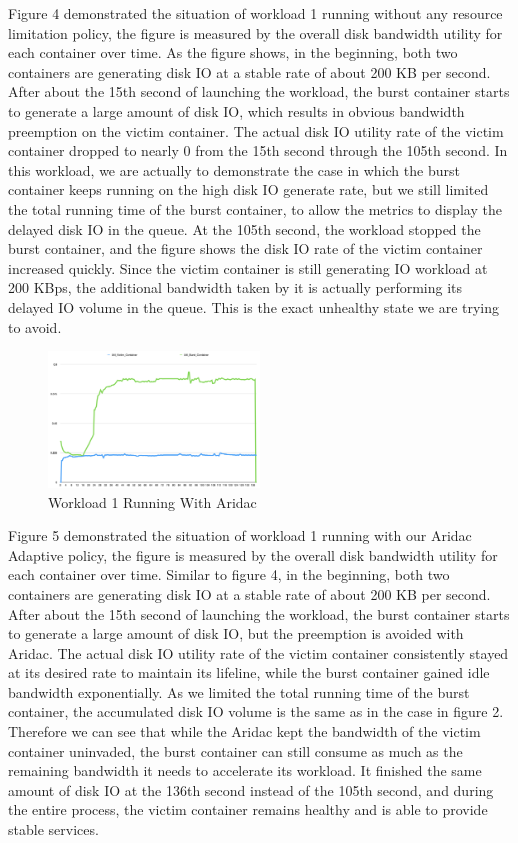 \documentclass[10pt, conference,compsoc]{IEEEtran}
\begin{document}
Figure 4 demonstrated the situation of workload 1 running without any resource limitation policy, the figure is measured by the overall disk bandwidth utility for each container over time. As the figure shows, in the beginning, both two containers are generating disk IO at a stable rate of about 200 KB per second. After about the 15th second of launching the workload, the burst container starts to generate a large amount of disk IO, which results in obvious bandwidth preemption on the victim container. The actual disk IO utility rate of the victim container dropped to nearly 0 from the 15th second through the 105th second. In this workload, we are actually to demonstrate the case in which the burst container keeps running on the high disk IO generate rate, but we still limited the total running time of the burst container, to allow the metrics to display the delayed disk IO in the queue. At the 105th second, the workload stopped the burst container, and the figure shows the disk IO rate of the victim container increased quickly. Since the victim container is still generating IO workload at 200 KBps, the additional bandwidth taken by it is actually performing its delayed IO volume in the queue. This is the exact unhealthy state we are trying to avoid.\\

\begin{figure}[h]
\centering
\includegraphics[width=0.5\textwidth]{./images/workload1_2.png}
\caption{Workload 1 Running With Aridac}
\end{figure}


Figure 5 demonstrated the situation of workload 1 running with our Aridac Adaptive policy, the figure is measured by the overall disk bandwidth utility for each container over time. Similar to figure 4, in the beginning, both two containers are generating disk IO at a stable rate of about 200 KB per second. After about the 15th second of launching the workload, the burst container starts to generate a large amount of disk IO, but the preemption is avoided with Aridac. The actual disk IO utility rate of the victim container consistently stayed at its desired rate to maintain its lifeline, while the burst container gained idle bandwidth exponentially. As we limited the total running time of the burst container, the accumulated disk IO volume is the same as in the case in figure 2.  Therefore we can see that while the Aridac kept the bandwidth of the victim container uninvaded, the burst container can still consume as much as the remaining bandwidth it needs to accelerate its workload. It finished the same amount of disk IO at the 136th second instead of the 105th second, and during the entire process, the victim container remains healthy and is able to provide stable services.\\
\end{document}
